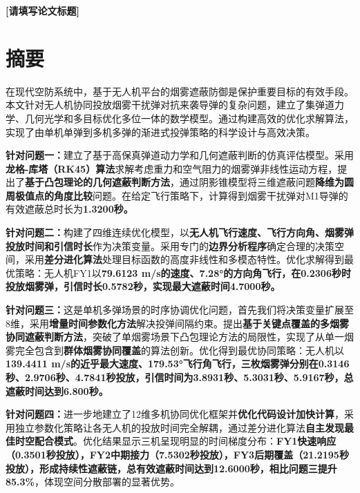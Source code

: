 \documentclass[fontset=SimSun]{ctexart}
\begin{document}
\setcounter{page}{1}
\begin{center}
    {\LARGE \textbf{[请填写论文标题]}} \\[0.5cm]
\end{center}

\vspace{0.5cm}

\section*{摘要}

在现代空防系统中，基于无人机平台的烟雾遮蔽防御是保护重要目标的有效手段。本文针对无人机协同投放烟雾干扰弹对抗来袭导弹的复杂问题，建立了集弹道力学、几何光学和多目标优化多位一体的数学模型。通过构建高效的优化求解算法，实现了由单机单弹到多机多弹的渐进式投弹策略的科学设计与高效决策。

\textbf{针对问题一：}建立了基于高保真弹道动力学和几何遮蔽判断的仿真评估模型。采用\textbf{龙格-库塔（RK45）算法}求解考虑重力和空气阻力的烟雾弹非线性运动方程，提出了\textbf{基于凸包理论的几何遮蔽判断方法}，通过阴影锥模型将三维遮蔽问题\textbf{降维为圆周极值点的角度比较}问题。在给定飞行策略下，计算得到烟雾干扰弹对M1导弹的有效遮蔽总时长为\textbf{1.3200秒。}

\textbf{针对问题二：}构建了四维连续优化模型，以\textbf{无人机飞行速度、飞行方向角、烟雾弹投放时间和引信时长}作为决策变量。采用专门的\textbf{边界分析程序}确定合理的决策空间，采用\textbf{差分进化算法}处理目标函数的高度非线性和多模态特性。优化求解得到最优策略：无人机FY1以\textbf{79.6123 m/s的速度、7.28°的方向角飞行，在0.2306秒时投放烟雾弹，引信时长0.5782秒，实现最大遮蔽时间4.7000秒。}

\textbf{针对问题三：}这是单机多弹场景的时序协调优化问题，首先我们将决策变量扩展至8维，采用\textbf{增量时间参数化方法}解决投弹间隔约束。提出\textbf{基于关键点覆盖的多烟雾协同遮蔽判断方法}，突破了单烟雾场景下凸包理论方法的局限性，实现了从单一烟雾完全包含到\textbf{群体烟雾协同覆盖}的算法创新。优化得到最优协同策略：无人机以\textbf{139.4411 m/s的近乎最大速度、179.53°飞行角飞行，三枚烟雾弹分别在0.3146秒、2.9706秒、4.7841秒投放，引信时间为3.8931秒、5.3031秒、5.9167秒，总遮蔽时间达到6.800秒。}

\textbf{针对问题四：}进一步地建立了12维多机协同优化框架并\textbf{优化代码设计加快计算}，采用独立参数化策略让各无人机的投放时间完全解耦，通过差分进化算法\textbf{自主发现最佳时空配合模式}。优化结果显示三机呈现明显的时间梯度分布：\textbf{FY1快速响应（0.3501秒投放），FY2中期接力（7.5302秒投放），FY3后期覆盖（21.2195秒投放），形成持续性遮蔽链，总有效遮蔽时间达到12.6000秒，相比问题三提升85.3\%}，体现空间分散部署的显著优势。
\end{document}
